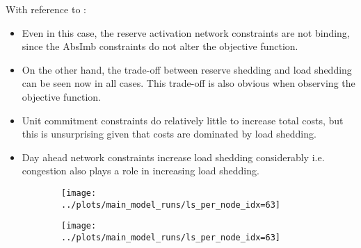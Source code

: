 \documentclass[number,times]{elsarticle}
\begin{document}

With reference to :

\begin{itemize}
    \item Even in this case, the reserve activation network constraints are not binding, since the AbsImb constraints do not alter the objective function.
    \item On the other hand, the trade-off between reserve shedding and load shedding can be seen now in all cases. This trade-off is also obvious when observing the objective function.
    \item Unit commitment constraints do relatively little to increase total costs, but this is unsurprising given that costs are dominated by load shedding.
    \item Day ahead network constraints increase load shedding considerably i.e. congestion also plays a role in increasing load shedding.
\end{itemize}


\begin{figure}[H]
    \centering
    \begin{subfigure}[t]{0.45\textwidth}
        \centering
        \texttt{[image: ../plots/main\_model\_runs/ls\_per\_node\_idx=63]}
        \caption{}
    \end{subfigure}
    \begin{subfigure}[t]{0.45\textwidth}
        \centering
        \texttt{[image: ../plots/main\_model\_runs/ls\_per\_node\_idx=63]}
        \caption{}
    \end{subfigure}
    \caption{}
\end{figure}
\end{document}
